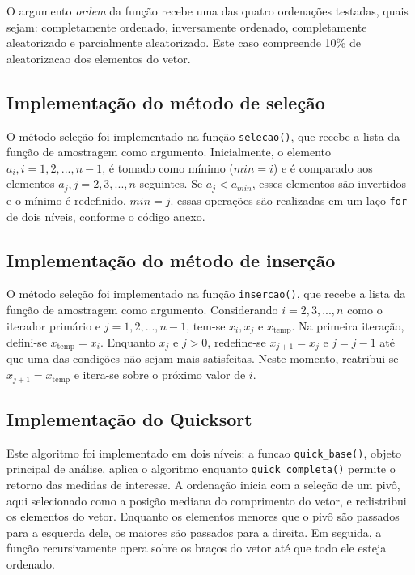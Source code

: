 \documentclass[
]{article}
\begin{document}
O argumento \emph{ordem} da função recebe uma das quatro ordenações
testadas, quais sejam: completamente ordenado, inversamente ordenado,
completamente aleatorizado e parcialmente aleatorizado. Este caso
compreende 10\% de aleatorizacao dos elementos do vetor.

\hypertarget{implementauxe7uxe3o-do-muxe9todo-de-seleuxe7uxe3o}{%
\subsection{Implementação do método de
seleção}\label{implementauxe7uxe3o-do-muxe9todo-de-seleuxe7uxe3o}}

O método seleção foi implementado na função \texttt{selecao()}, que
recebe a lista da função de amostragem como argumento. Inicialmente, o
elemento \(a_i, i = 1, 2, ..., n-1\), é tomado como mínimo (\(min = i\))
e é comparado aos elementos \(a_j, j = 2, 3, ..., n\) seguintes. Se
\(a_j < a_{min}\), esses elementos são invertidos e o mínimo é
redefinido, \(min = j\). essas operações são realizadas em um laço
\texttt{for} de dois níveis, conforme o código anexo.

\hypertarget{implementauxe7uxe3o-do-muxe9todo-de-inseruxe7uxe3o}{%
\subsection{Implementação do método de
inserção}\label{implementauxe7uxe3o-do-muxe9todo-de-inseruxe7uxe3o}}

O método seleção foi implementado na função \texttt{insercao()}, que
recebe a lista da função de amostragem como argumento. Considerando
\(i = 2, 3, ..., n\) como o iterador primário e \(j = 1, 2, ..., n-1\),
tem-se \(x_i, x_j\) e \(x_{\text{temp}}\). Na primeira iteração,
defini-se \(x_{\text{temp}} = x_i\). Enquanto \(x_j\) e \(j>0\),
redefine-se \(x_{j+1} = x_j\) e \(j = j-1\) até que uma das condições
não sejam mais satisfeitas. Neste momento, reatribui-se
\(x_{j+1} = x_{\text{temp}}\) e itera-se sobre o próximo valor de \(i\).

\hypertarget{implementauxe7uxe3o-do-quicksort}{%
\subsection{Implementação do
Quicksort}\label{implementauxe7uxe3o-do-quicksort}}

Este algoritmo foi implementado em dois níveis: a funcao
\texttt{quick\_base()}, objeto principal de análise, aplica o algoritmo
enquanto \texttt{quick\_completa()} permite o retorno das medidas de
interesse. A ordenação inicia com a seleção de um pivô, aqui selecionado
como a posição mediana do comprimento do vetor, e redistribui os
elementos do vetor. Enquanto os elementos menores que o pivô são
passados para a esquerda dele, os maiores são passados para a direita.
Em seguida, a função recursivamente opera sobre os braços do vetor até
que todo ele esteja ordenado.
\end{document}

